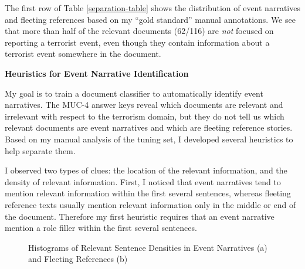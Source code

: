 The first row of Table \ref{separation-table} shows the distribution of event narratives and
fleeting references based on my ``gold standard'' manual annotations.
We see that more than half of the relevant documents (62/116) are {\it not}
focused on reporting a terrorist event, even though they contain information about a terrorist event somewhere in the document.

\vspace{.1in}
{\bf Heuristics for Event Narrative Identification}
\vspace{.1in}

My goal is to train a document classifier to automatically identify
event narratives. The MUC-4 answer keys reveal which documents are
relevant and irrelevant with respect to the terrorism domain, but they
do not tell us which relevant documents are event narratives and which
are fleeting reference stories. Based on my manual analysis of the
tuning set, I developed several heuristics to help separate them.

I observed two types of clues: the location of the
relevant information, and the density of relevant information. First,
I noticed that event narratives tend to mention relevant information
within the first several sentences, whereas fleeting reference texts
usually mention relevant information only in the middle or end
of the document. Therefore my first heuristic requires that an event
narrative
mention a role filler within the first 
several sentences. %

\begin{figure}[h]
\center
\caption{Histograms of Relevant Sentence Densities in Event Narratives (a) and Fleeting References (b)}
\label{histograms}
\end{figure}

